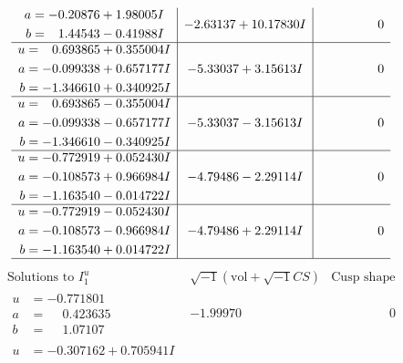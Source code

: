 \documentclass[1p]{elsarticle_modified}
\theoremstyle{definition}
\newcommand{\I}{\sqrt{-1}}
\begin{document}
$$\begin{array}{c|c|c}
\begin{aligned}
a &= -0.20876 + 1.98005 I \\
b &= \phantom{-}1.44543 - 0.41988 I\end{aligned}
 & -2.63137 + 10.17830 I & \phantom{-0.000000 } 0 \\ \hline\begin{aligned}
u &= \phantom{-}0.693865 + 0.355004 I \\
a &= -0.099338 + 0.657177 I \\
b &= -1.346610 + 0.340925 I\end{aligned}
 & -5.33037 + 3.15613 I & \phantom{-0.000000 } 0 \\ \hline\begin{aligned}
u &= \phantom{-}0.693865 - 0.355004 I \\
a &= -0.099338 - 0.657177 I \\
b &= -1.346610 - 0.340925 I\end{aligned}
 & -5.33037 - 3.15613 I & \phantom{-0.000000 } 0 \\ \hline\begin{aligned}
u &= -0.772919 + 0.052430 I \\
a &= -0.108573 + 0.966984 I \\
b &= -1.163540 - 0.014722 I\end{aligned}
 & -4.79486 - 2.29114 I & \phantom{-0.000000 } 0 \\ \hline\begin{aligned}
u &= -0.772919 - 0.052430 I \\
a &= -0.108573 - 0.966984 I \\
b &= -1.163540 + 0.014722 I\end{aligned}
 & -4.79486 + 2.29114 I & \phantom{-0.000000 } 0\\
 \hline 
 \end{array}$$\newpage$$\begin{array}{c|c|c}  
\text{Solutions to }I^u_{1}& \I (\text{vol} + \sqrt{-1}CS) & \text{Cusp shape}\\
 \hline 
\begin{aligned}
u &= -0.771801\phantom{ +0.000000I} \\
a &= \phantom{-}0.423635\phantom{ +0.000000I} \\
b &= \phantom{-}1.07107\phantom{ +0.000000I}\end{aligned}
 & -1.99970\phantom{ +0.000000I} & \phantom{-0.000000 } 0 \\ \hline\begin{aligned}
u &= -0.307162 + 0.705941 I \\

\end{aligned}
\end{array}$$
\end{document}

